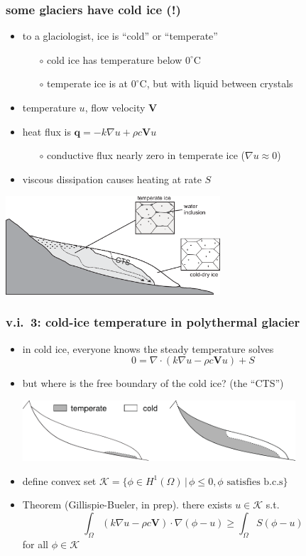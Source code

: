 \documentclass{beamer}
\newcommand{\Kcal}{\mathcal{K}}
\newcommand{\Div}{\nabla\cdot}
\newcommand{\grad}{\nabla}
\begin{document}
\begin{frame}
  \frametitle{some glaciers have cold ice (!)}

\begin{itemize}
\item to a glaciologist, ice is ``cold'' or ``temperate''
  \begin{itemize}
  \item[$\circ$] cold ice has temperature below $0^\circ$C
  \item[$\circ$] temperate ice is at $0^\circ$C, but with liquid between crystals
  \end{itemize}
\item temperature $u$, flow velocity $\mathbf{V}$
\item heat flux is $\mathbf{q} = - k \grad u + \rho c \mathbf{V} u$
  \begin{itemize}
  \item[$\circ$] conductive flux nearly zero in temperate ice ($\grad u \approx 0$)
  \end{itemize}
\item viscous dissipation causes heating at rate $S$
\end{itemize}

\includegraphics[width=0.6\textwidth]{figs/mws-simplified} \tiny {}
\end{frame}


\begin{frame}
  \frametitle{v.i.~3: cold-ice temperature in polythermal glacier}

\begin{itemize}
\item in cold ice, everyone knows the steady temperature solves
    $$0 = \Div \left(k \grad u - \rho c \mathbf{V} u\right) + S$$
\item but where is the free boundary of the cold ice?  (the ``CTS'')
\begin{center}
\includegraphics[width=0.8\textwidth]{figs/CTSstructures-2land}
\end{center}
\item define convex set $\Kcal = \{ \phi \in H^1(\Omega) \,\big|\, \phi \le 0, \phi \text{ satisfies b.c.s} \}$
\item Theorem (Gillispie-Bueler, in prep).  there exists $u \in \Kcal$ s.t.
  $$\int_\Omega \left(k \grad u - \rho c \mathbf{V}\right) \cdot \grad(\phi - u) \ge \int_\Omega S (\phi-u)$$
for all $\phi \in \Kcal$
\end{itemize}
\end{frame}
\end{document}
